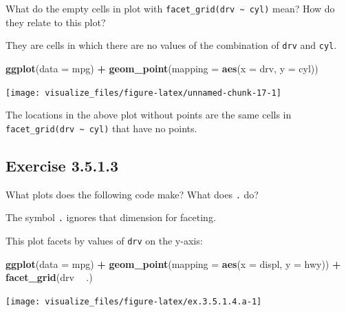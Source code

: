 \documentclass[]{book}
\newenvironment{Shaded}{\begin{snugshade}}{\end{snugshade}}
\newcommand{\DataTypeTok}[1]{\textcolor[rgb]{0.13,0.29,0.53}{#1}}
\newcommand{\KeywordTok}[1]{\textcolor[rgb]{0.13,0.29,0.53}{\textbf{#1}}}
\newcommand{\NormalTok}[1]{#1}
\newcommand{\OperatorTok}[1]{\textcolor[rgb]{0.81,0.36,0.00}{\textbf{#1}}}
\newcommand{\StringTok}[1]{\textcolor[rgb]{0.31,0.60,0.02}{#1}}
\theoremstyle{plain}
\theoremstyle{remark}
\begin{document}
What do the empty cells in plot with \texttt{facet\_grid(drv\ \textasciitilde{}\ cyl)} mean? How do they relate to this plot?

They are cells in which there are no values of the combination of \texttt{drv} and \texttt{cyl}.

\begin{Shaded}
\begin{Highlighting}[]
\KeywordTok{ggplot}\NormalTok{(}\DataTypeTok{data =}\NormalTok{ mpg) }\OperatorTok{+}
\StringTok{  }\KeywordTok{geom_point}\NormalTok{(}\DataTypeTok{mapping =} \KeywordTok{aes}\NormalTok{(}\DataTypeTok{x =}\NormalTok{ drv, }\DataTypeTok{y =}\NormalTok{ cyl))}
\end{Highlighting}
\end{Shaded}

\begin{center}\texttt{[image: visualize\_files/figure-latex/unnamed-chunk-17-1]} \end{center}

The locations in the above plot without points are the same cells in \texttt{facet\_grid(drv\ \textasciitilde{}\ cyl)} that have no points.

\hypertarget{exercise-3.5.1.3}{%
\subsection*{\texorpdfstring{Exercise {3.5.1.3}}{Exercise 3.5.1.3}}\label{exercise-3.5.1.3}}

What plots does the following code make? What does \texttt{.} do?

The symbol \texttt{.} ignores that dimension for faceting.

This plot facets by values of \texttt{drv} on the y-axis:

\begin{Shaded}
\begin{Highlighting}[]
\KeywordTok{ggplot}\NormalTok{(}\DataTypeTok{data =}\NormalTok{ mpg) }\OperatorTok{+}
\StringTok{  }\KeywordTok{geom_point}\NormalTok{(}\DataTypeTok{mapping =} \KeywordTok{aes}\NormalTok{(}\DataTypeTok{x =}\NormalTok{ displ, }\DataTypeTok{y =}\NormalTok{ hwy)) }\OperatorTok{+}
\StringTok{  }\KeywordTok{facet_grid}\NormalTok{(drv }\OperatorTok{~}\StringTok{ }\NormalTok{.)}
\end{Highlighting}
\end{Shaded}

\begin{center}\texttt{[image: visualize\_files/figure-latex/ex.3.5.1.4.a-1]} \end{center}
\end{document}
